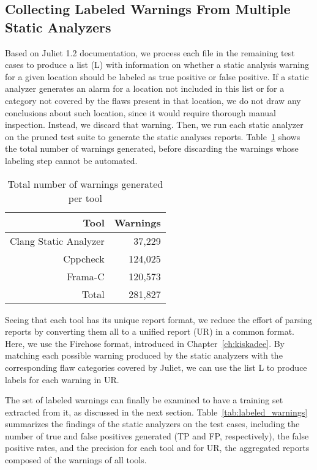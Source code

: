 \subsection{Collecting Labeled Warnings From Multiple Static Analyzers}\label{sec:data:labels}

Based on Juliet 1.2 documentation, we process each file in the remaining test
cases to produce a list (L) with information on whether a static analysis
warning for a given location should be labeled as true positive or false
positive. If a static analyzer generates an alarm for a location not included
in this list or for a category not covered by the flaws present in that location, we do not
draw any conclusions about such location, since it would require thorough
manual inspection. Instead, we discard that warning. Then, we run each static
analyzer on the pruned test suite to generate the static analyses reports.
Table~\ref{tab:unlabeled_warnings} shows the total number of warnings
generated, before discarding the warnings whose labeling step cannot be
automated.

  \begin{table}
    \begin{center}
        \begin{tabular}{rr}\hline
          Tool & Warnings \\
        \hline
          Clang Static Analyzer & 37,229 \\
          Cppcheck & 124,025 \\
          Frama-C & 120,573 \\
          Total & 281,827 \\ \hline
        \end{tabular}
        \caption{Total number of warnings generated per tool}\label{tab:unlabeled_warnings}
    \end{center}
\end{table}

Seeing that each tool has its unique report format, we reduce the effort of
parsing reports by converting them all to a unified report (UR) in a common
format. Here, we use the Firehose format, introduced in
Chapter~\ref{ch:kiskadee}.  By matching each possible warning produced by the
static analyzers with the corresponding flaw categories covered by Juliet, we
can use the list L to produce labels for each warning in UR.

The set of labeled warnings can finally be examined to have a training set
extracted from it, as discussed in the next section.
Table~\ref{tab:labeled_warnings} summarizes the findings of the static
analyzers on the test cases, including the number of true and false positives
generated (TP and FP, respectively), the false positive rates, and the precision
for each tool and for UR, the aggregated reports composed of the warnings of
all tools.

